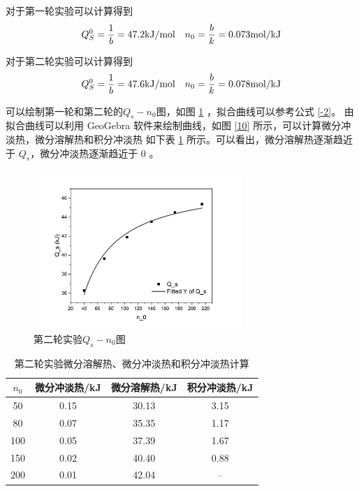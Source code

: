 \documentclass[cn,hazy,pku,12pt,normal,math=newtx,cite=super]{elegantnote}
\begin{document}
对于第一轮实验可以计算得到
\begin{equation}
    Q_S^0 = \frac{1}{b} = 47.2 {\rm kJ/mol} \quad
    n_0 = \frac{b}{k} = 0.073 {\rm mol/kJ}
\end{equation}

对于第二轮实验可以计算得到
\begin{equation}
    Q_S^0 = \frac{1}{b} = 47.6 {\rm kJ/mol} \quad
    n_0 = \frac{b}{k} = 0.078 {\rm mol/kJ}
\end{equation}

可以绘制第一轮和第二轮的$Q_s-n_0$图，如图 \ref{9} ，拟合曲线可以参考公式 \ref{-2}。
由拟合曲线可以利用 GeoGebra 软件来绘制曲线，如图 \ref{10} 所示，可以计算微分冲淡热，微分溶解热和积分冲淡热
如下表 \ref{08} 所示。可以看出，微分溶解热逐渐趋近于 $Q_s$，微分冲淡热逐渐趋近于 0 。
\begin{figure}[htbp]
    \centering
    \includegraphics[width = 0.70\textwidth]{image/Graph13.png}
    \caption{第二轮实验$Q_s-n_0$图}\label{9}
\end{figure}

\begin{table}[h]
    \centering
    \caption{第二轮实验微分溶解热、微分冲淡热和积分冲淡热计算}
    \label{08}
    \begin{tabular}{cccc}
    \hline
    $n_0$ & 微分冲淡热/kJ & 微分溶解热/kJ & 积分冲淡热/kJ \\ \hline
    50    & 0.15     & 30.13    & 3.15     \\
    80    & 0.07     & 35.35    & 1.17     \\
    100   & 0.05     & 37.39    & 1.67     \\
    150   & 0.02     & 40.40    & 0.88     \\
    200   & 0.01     & 42.04    & --       \\ \hline
    \end{tabular}
\end{table}
\end{document}
